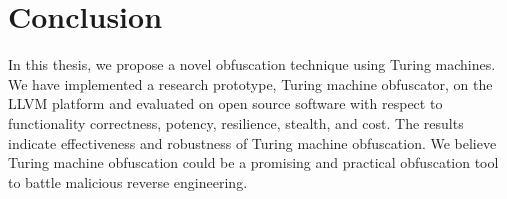 \chapter{Conclusion}
In this thesis, we propose a novel obfuscation technique using 
 Turing machines. We have implemented a research prototype, Turing
machine obfuscator, on the LLVM platform and evaluated %
on open source software with respect to functionality
correctness, potency, resilience, stealth, and cost. The results
indicate effectiveness and robustness of Turing machine obfuscation. We believe
Turing machine obfuscation could be a promising and practical obfuscation tool to
battle malicious reverse engineering.